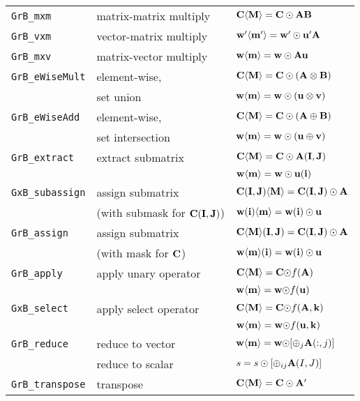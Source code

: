 \documentclass[12pt]{article}
\begin{document}
\vspace{0.05in}
{\footnotesize
\begin{tabular}{lll}
\hline
\verb'GrB_mxm'       & matrix-matrix multiply  & ${\bf C \langle M \rangle = C \odot AB}$ \\
\verb'GrB_vxm'       & vector-matrix multiply  & ${\bf w'\langle m'\rangle = w'\odot u'A}$ \\
\verb'GrB_mxv'       & matrix-vector multiply  & ${\bf w \langle m \rangle = w \odot Au}$ \\
\hline
\verb'GrB_eWiseMult' & element-wise,           & ${\bf C \langle M \rangle = C \odot (A \otimes B)}$ \\
                     & set union               & ${\bf w \langle m \rangle = w \odot (u \otimes v)}$ \\
\hline
\verb'GrB_eWiseAdd'  & element-wise,           & ${\bf C \langle M \rangle = C \odot (A \oplus  B)}$ \\
                     & set intersection        & ${\bf w \langle m \rangle = w \odot (u \oplus  v)}$ \\
\hline
\verb'GrB_extract'   & extract submatrix       & ${\bf C \langle M \rangle = C \odot A(I,J)}$ \\
                     &                         & ${\bf w \langle m \rangle = w \odot u(i)}$ \\
\hline
\verb'GxB_subassign' & assign submatrix        & ${\bf C (I,J) \langle M \rangle = C(I,J) \odot A}$ \\
                     & (with submask for ${\bf C(I,J)}$)
                                               & ${\bf w (i)   \langle m \rangle = w(i)   \odot u}$ \\
\hline
\verb'GrB_assign'    & assign submatrix        & ${\bf C \langle M \rangle (I,J) = C(I,J) \odot A}$ \\
                     & (with mask for ${\bf C}$)
                                               & ${\bf w \langle m \rangle (i)   = w(i)   \odot u}$ \\
\hline
\verb'GrB_apply'     & apply unary operator    & ${\bf C \langle M \rangle = C \odot} f{\bf (A)}$ \\
                     &                         & ${\bf w \langle m \rangle = w \odot} f{\bf (u)}$ \\
\hline
\verb'GxB_select'    & apply select operator   & ${\bf C \langle M \rangle = C \odot} f{\bf (A,k)}$ \\
                     &                         & ${\bf w \langle m \rangle = w \odot} f{\bf (u,k)}$ \\
\hline
\verb'GrB_reduce'    & reduce to vector        & ${\bf w \langle m \rangle = w \odot} [{\oplus}_j {\bf A}(:,j)]$ \\
                     & reduce to scalar        & $s = s \odot [{\oplus}_{ij}  {\bf A}(I,J)]$ \\
\hline
\verb'GrB_transpose' & transpose               & ${\bf C \langle M \rangle = C \odot A'}$ \\
\hline
\end{tabular}
}
\vspace{0.05in}
\end{document}
